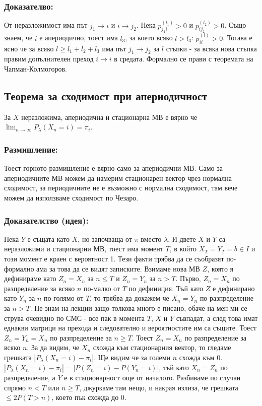 \documentclass{article}
\begin{document}
\subsubsection*{Доказателво:}
От неразложимост има път $j_1 \to i$ и $i \to j_2$. Нека $p_{j_1i}^{(l_1)} > 0$ и $p_{ij_2}^{(l_2)} > 0$. Също знаем, че $i$ е апериодично, тоест 
има $l_3$, за което всяко $l > l_3$: $p_{ii}^{(l)} > 0$. Тогава е ясно че за всяко $l \geq l_1 + l_2 + l_3$ има път $j_1 \to j_2$ за $l$ стъпки - за всяка 
нова стъпка правим допълнителен преход $i \to i$ в средата. Формално се прави с теоремата на Чапман-Колмогоров.

\subsection{Теорема за сходимост при апериодичност}
За $X$ неразложима, апериодична и стационарна МВ е вярно че $\lim_{n\to\infty} P_\lambda(X_n = i) = \pi_i$.

\subsubsection*{Размишление:}
Тоест горното размишление е вярно само за апериодични МВ. Само за апериодичните МВ 
можем да намерим стационарен вектор чрез нормална сходимост, за периодичните не е възможно с нормална сходимост, 
там вече можем да използваме сходимост по Чезаро.

\subsubsection*{Доказателство (идея):}
Нека $Y$ е същата като $X$, но започваща от $\pi$ вместо $\lambda$. И двете $X$ и $Y$ са неразложими и стационарни МВ, тоест има момент $T$, в 
който $X_T = Y_T = b \in I$ и този момент е краен с вероятност 1. Тези факти трябва да се съобразят по-формално ама за това да се 
видят записките. Взимаме нова МВ $Z$, която я дефинираме като $Z_n = X_n$ за $n \leq T$ и $Z_n = Y_n$ за $n > T$. Първо, $Z_n = X_n$ по разпределение 
за всяко $n$ по-малко от $T$ по дефиниция. Тъй като $Z$ е дефинирано като $Y_n$ за $n$ по-голямо от $T$, то трябва да докажем 
че $X_n = Y_n$ по разпределение за $n > T$. Не знам на лекции защо толкова много е писано, обаче на мен ми се струва очевидно по СМС - все пак 
в момента $T$, $X$ и $Y$ съвпадат, а след това имат еднакви матрици на прехода и следователно и вероятностите им са същите. 
Тоест $Z_n = Y_n = X_n$ по разпределение за $n \geq T$. Тоест $Z_n = X_n$ по разпределение за всяко $n$. За да видим, че 
$X_n$ схожда към стационарния вектор, то гледаме грешката $|P_\lambda(X_n = i) - \pi_i|$. Ще видим че за големи $n$ схожда към 0. 
$|P_\lambda(X_n = i) - \pi_i| = |P(Z_n = i) - P(Y_n = i)|$, тъй като $X_n = Z_n$ по разпределение, а $Y$ е в стационарност още от началото. Разбиваме по случаи 
спрямо $n < T$ или $n \geq T$, джуркаме там нещо, и накрая излиза, че грешката $\leq 2P(T > n)$, което пък схожда до 0.
\end{document}

